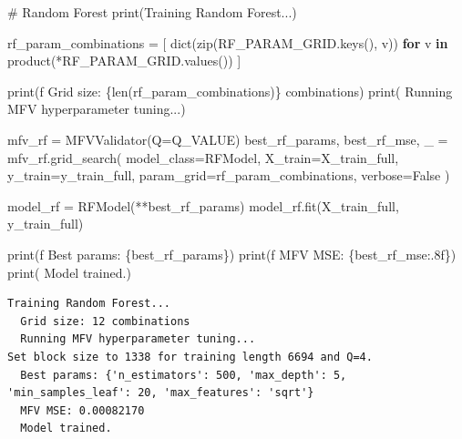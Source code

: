 \documentclass[
  letterpaper,
  DIV=11,
  numbers=noendperiod]{scrartcl}
\newenvironment{Shaded}{\begin{snugshade}}{\end{snugshade}}
\newcommand{\BuiltInTok}[1]{\textcolor[rgb]{0.00,0.23,0.31}{#1}}
\newcommand{\CommentTok}[1]{\textcolor[rgb]{0.37,0.37,0.37}{#1}}
\newcommand{\ControlFlowTok}[1]{\textcolor[rgb]{0.00,0.23,0.31}{\textbf{#1}}}
\newcommand{\KeywordTok}[1]{\textcolor[rgb]{0.00,0.23,0.31}{\textbf{#1}}}
\newcommand{\NormalTok}[1]{\textcolor[rgb]{0.00,0.23,0.31}{#1}}
\newcommand{\OperatorTok}[1]{\textcolor[rgb]{0.37,0.37,0.37}{#1}}
\newcommand{\SpecialCharTok}[1]{\textcolor[rgb]{0.37,0.37,0.37}{#1}}
\newcommand{\SpecialStringTok}[1]{\textcolor[rgb]{0.13,0.47,0.30}{#1}}
\newcommand{\StringTok}[1]{\textcolor[rgb]{0.13,0.47,0.30}{#1}}
\newcommand{\VariableTok}[1]{\textcolor[rgb]{0.07,0.07,0.07}{#1}}
\begin{document}
\begin{Shaded}
\begin{Highlighting}[]
\CommentTok{\# Random Forest}
\BuiltInTok{print}\NormalTok{(}\StringTok{\textquotesingle{}Training Random Forest...\textquotesingle{}}\NormalTok{)}

\NormalTok{rf\_param\_combinations }\OperatorTok{=}\NormalTok{ [}
    \BuiltInTok{dict}\NormalTok{(}\BuiltInTok{zip}\NormalTok{(RF\_PARAM\_GRID.keys(), v))}
    \ControlFlowTok{for}\NormalTok{ v }\KeywordTok{in}\NormalTok{ product(}\OperatorTok{*}\NormalTok{RF\_PARAM\_GRID.values())}
\NormalTok{]}

\BuiltInTok{print}\NormalTok{(}\SpecialStringTok{f\textquotesingle{}  Grid size: }\SpecialCharTok{\{}\BuiltInTok{len}\NormalTok{(rf\_param\_combinations)}\SpecialCharTok{\}}\SpecialStringTok{ combinations\textquotesingle{}}\NormalTok{)}
\BuiltInTok{print}\NormalTok{(}\StringTok{\textquotesingle{}  Running MFV hyperparameter tuning...\textquotesingle{}}\NormalTok{)}

\NormalTok{mfv\_rf }\OperatorTok{=}\NormalTok{ MFVValidator(Q}\OperatorTok{=}\NormalTok{Q\_VALUE)}
\NormalTok{best\_rf\_params, best\_rf\_mse, \_ }\OperatorTok{=}\NormalTok{ mfv\_rf.grid\_search(}
\NormalTok{    model\_class}\OperatorTok{=}\NormalTok{RFModel,}
\NormalTok{    X\_train}\OperatorTok{=}\NormalTok{X\_train\_full, y\_train}\OperatorTok{=}\NormalTok{y\_train\_full,}
\NormalTok{    param\_grid}\OperatorTok{=}\NormalTok{rf\_param\_combinations, verbose}\OperatorTok{=}\VariableTok{False}
\NormalTok{)}

\NormalTok{model\_rf }\OperatorTok{=}\NormalTok{ RFModel(}\OperatorTok{**}\NormalTok{best\_rf\_params)}
\NormalTok{model\_rf.fit(X\_train\_full, y\_train\_full)}

\BuiltInTok{print}\NormalTok{(}\SpecialStringTok{f\textquotesingle{}  Best params: }\SpecialCharTok{\{}\NormalTok{best\_rf\_params}\SpecialCharTok{\}}\SpecialStringTok{\textquotesingle{}}\NormalTok{)}
\BuiltInTok{print}\NormalTok{(}\SpecialStringTok{f\textquotesingle{}  MFV MSE: }\SpecialCharTok{\{}\NormalTok{best\_rf\_mse}\SpecialCharTok{:.8f\}}\SpecialStringTok{\textquotesingle{}}\NormalTok{)}
\BuiltInTok{print}\NormalTok{(}\StringTok{\textquotesingle{}  Model trained.\textquotesingle{}}\NormalTok{)}
\end{Highlighting}
\end{Shaded}

\begin{verbatim}
Training Random Forest...
  Grid size: 12 combinations
  Running MFV hyperparameter tuning...
Set block size to 1338 for training length 6694 and Q=4.
  Best params: {'n_estimators': 500, 'max_depth': 5, 'min_samples_leaf': 20, 'max_features': 'sqrt'}
  MFV MSE: 0.00082170
  Model trained.
\end{verbatim}
\end{document}
